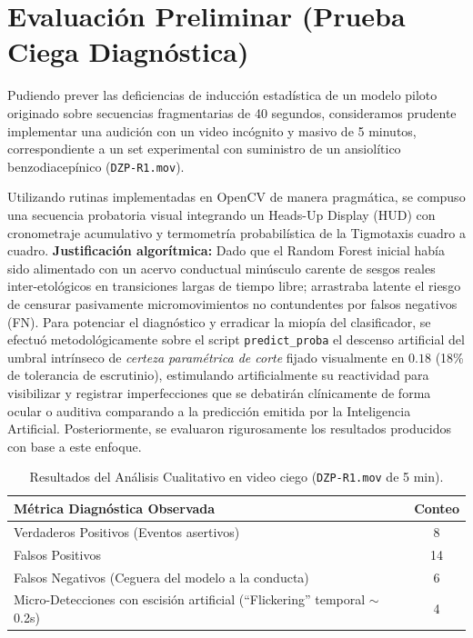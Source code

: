 \documentclass[12pt,a4paper]{article}
\begin{document}
\section{Evaluación Preliminar (Prueba Ciega Diagnóstica)}
Pudiendo prever las deficiencias de inducción estadística de un modelo piloto originado sobre secuencias fragmentarias de 40 segundos, consideramos prudente implementar una audición con un video incógnito y masivo de 5 minutos, correspondiente a un set experimental con suministro de un ansiolítico benzodiacepínico (\texttt{DZP-R1.mov}).

Utilizando rutinas implementadas en OpenCV de manera pragmática, se compuso una secuencia probatoria visual integrando un Heads-Up Display (HUD) con cronometraje acumulativo y termometría probabilística de la Tigmotaxis cuadro a cuadro. \textbf{Justificación algorítmica:} Dado que el Random Forest inicial había sido alimentado con un acervo conductual minúsculo carente de sesgos reales inter-etológicos en transiciones largas de tiempo libre; arrastraba latente el riesgo de censurar pasivamente micromovimientos no contundentes por falsos negativos (FN).  Para potenciar el diagnóstico y erradicar la miopía del clasificador, se efectuó metodológicamente sobre el script \texttt{predict\_proba} el descenso artificial del umbral intrínseco de \textit{certeza paramétrica de corte} fijado visualmente en $0.18$ (18\% de tolerancia de escrutinio), estimulando artificialmente su reactividad para visibilizar y registrar imperfecciones que se debatirán clínicamente de forma ocular o auditiva comparando a la predicción emitida por la Inteligencia Artificial. Posteriormente, se evaluaron rigurosamente los resultados producidos con base a este enfoque.

\begin{table}[h!]
\centering
\begin{tabular}{lc}
\toprule
\textbf{Métrica Diagnóstica Observada} & \textbf{Conteo} \\
\midrule
Verdaderos Positivos (Eventos asertivos) & 8 \\
Falsos Positivos & 14 \\
Falsos Negativos (Ceguera del modelo a la conducta) & 6 \\
Micro-Detecciones con escisión artificial (``Flickering'' temporal $\sim$0.2s) & 4 \\
\bottomrule
\end{tabular}
\caption{Resultados del Análisis Cualitativo en video ciego (\texttt{DZP-R1.mov} de 5 min).}
\end{table}
\end{document}
